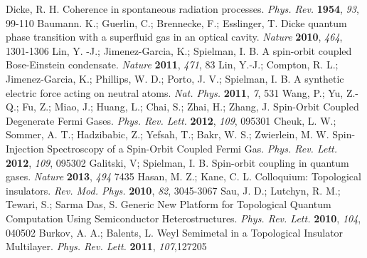 \documentclass[atoms,article,submit,moreauthors,pdftex,12pt,a4paper]{mdpi}
\begin{document}
\begin{thebibliography}{999}

Dicke, R. H. Coherence in spontaneous radiation processes. {\em Phys. Rev.} {\bf 1954}, {\em 93}, 99-110
Baumann. K.; Guerlin, C.; Brennecke, F.; Esslinger, T. Dicke quantum phase transition with a superfluid gas in an optical cavity. {\em Nature} {\bf 2010}, {\em 464}, 1301-1306   
Lin, Y. -J.; Jimenez-Garcia, K.; Spielman, I. B. A spin-orbit coupled Bose-Einstein condensate. {\em Nature} {\bf 2011}, {\em 471}, 83
Lin, Y.-J.; Compton, R. L.; Jimenez-Garcia, K.; Phillips, W. D.; Porto, J. V.; Spielman, I. B. A synthetic electric force acting on neutral atoms. {\em Nat. Phys.} {\bf 2011}, {\em 7}, 531
Wang, P.; Yu, Z.-Q.; Fu, Z.; Miao, J.; Huang, L.; Chai, S.; Zhai, H.; Zhang, J. Spin-Orbit Coupled Degenerate Fermi Gases. {\em Phys. Rev. Lett.} {\bf 2012}, {\em 109}, 095301
Cheuk, L. W.; Sommer, A. T.; Hadzibabic, Z.; Yefsah, T.; Bakr, W. S.; Zwierlein, M. W. Spin-Injection Spectroscopy of a Spin-Orbit Coupled Fermi Gas. {\em Phys. Rev. Lett.} {\bf 2012}, {\em 109}, 095302
Galitski, V; Spielman, I. B. Spin-orbit coupling in quantum gases. {\em Nature} {\bf 2013}, {\em 494} 7435
Hasan, M. Z.; Kane, C. L. Colloquium: Topological insulators. {\em Rev. Mod. Phys.} {\bf 2010}, {\em 82}, 3045-3067
Sau, J. D.; Lutchyn, R. M.; Tewari, S.; Sarma Das, S. Generic New Platform for Topological Quantum Computation Using Semiconductor Heterostructures. {\em Phys. Rev. Lett.} {\bf 2010}, {\em 104}, 040502
Burkov, A. A.; Balents, L. Weyl Semimetal in a Topological Insulator Multilayer. {\em Phys. Rev. Lett.} {\bf 2011}, {\em 107},127205

\end{thebibliography}
\end{document}
